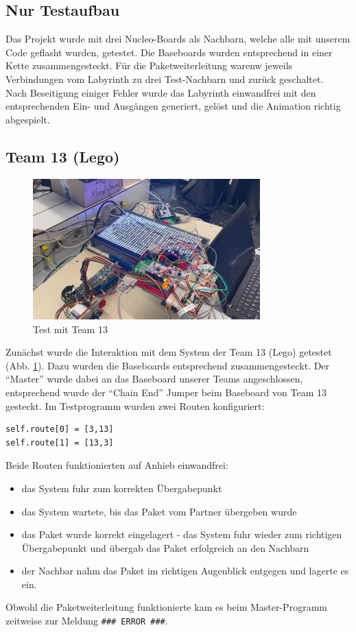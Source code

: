 \subsection{Nur Testaufbau}
Das Projekt wurde mit drei Nucleo-Boards als Nachbarn, welche alle mit unserem Code geflasht wurden, getestet. Die Baseboards wurden entsprechend in einer Kette zusammengesteckt. Für die Paketweiterleitung warenw jeweils Verbindungen vom Labyrinth zu drei Test-Nachbarn und zurück geschaltet. \\
Nach Beseitigung einiger Fehler wurde das Labyrinth einwandfrei mit den entsprechenden Ein- und Ausgängen generiert, gelöst und die Animation richtig abgespielt.

\subsection{Team 13 (Lego)}

\begin{figure}[H]
    \centering
    \includegraphics[page=1,width=0.78\textwidth]{images/Test_Team_13_cropped.PNG} 
    \caption{Test mit Team 13}
    \label{fig:Test_Team_13}
\end{figure}

Zunächst wurde die Interaktion mit dem System der Team 13 (Lego) getestet (Abb. \ref{fig:Test_Team_13}). Dazu wurden die Baseboards entsprechend zusammengesteckt. Der \enquote{Master} wurde dabei an das Baseboard unserer Teams angeschlossen, entsprechend wurde der \enquote{Chain End} Jumper beim Baseboard von Team 13 gesteckt. Im Testprogramm wurden zwei Routen konfiguriert:

\begin{lstlisting}[style=CBlank]
self.route[0] = [3,13] 
self.route[1] = [13,3]
\end{lstlisting}

\noindent Beide Routen funktionierten auf Anhieb einwandfrei:
\begin{itemize}
    \item das System fuhr zum korrekten Übergabepunkt
    \item das System wartete, bis das Paket vom Partner übergeben wurde
    \item das Paket wurde korrekt eingelagert - das System fuhr wieder zum richtigen Übergabepunkt und übergab das Paket erfolgreich an den Nachbarn
    \item der Nachbar nahm das Paket im richtigen Augenblick entgegen und lagerte es ein.
\end{itemize}
Obwohl die Paketweiterleitung funktionierte kam es beim Master-Programm zeitweise zur Meldung \texttt{\#\#\# ERROR \#\#\#}.

